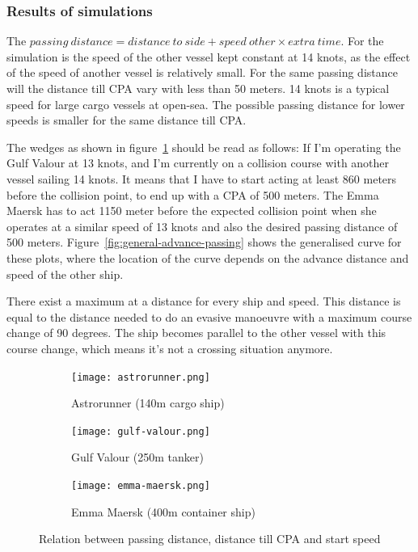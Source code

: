 \subsubsection{Results of simulations}
The $passing~distance = distance~to~side + speed~other \times extra~time$.
For the simulation is the speed of the other vessel kept constant at 14 knots, as the effect of the speed of another vessel is relatively small. For the same passing distance will the distance till CPA vary with less than 50 meters. 14 knots is a typical speed for large cargo vessels at open-sea. The possible passing distance for lower speeds is smaller for the same distance till CPA.

The wedges as shown in figure~\ref{fig:result-distance-passing-distance-start-speed} should be read as follows: If I'm operating the Gulf Valour at 13 knots, and I'm currently on a collision course with another vessel sailing 14 knots. It means that I have to start acting at least 860 meters before the collision point, to end up with a \ac{CPA} of 500 meters.
The Emma Maersk has to act 1150 meter before the expected collision point when she operates at a similar speed of 13 knots and also the desired passing distance of 500 meters. Figure~\ref{fig:general-advance-passing} shows the generalised curve for these plots, where the location of the curve depends on the advance distance and speed of the other ship.

There exist a maximum at a distance for every ship and speed. This distance is equal to the distance needed to do an evasive manoeuvre with a maximum course change of 90 degrees. The ship becomes parallel to the other vessel with this course change, which means it's not a crossing situation anymore.

\begin{figure}[!p]
	\centering
	\begin{subfigure}[b]{0.6\textwidth}
		\texttt{[image: astrorunner.png]} 
		\caption{Astrorunner (140m  cargo ship)} 
	\end{subfigure}
	\begin{subfigure}[b]{0.6\linewidth}
		\texttt{[image: gulf-valour.png]} 
		\caption{Gulf Valour (250m tanker)} 
	\end{subfigure}
	\begin{subfigure}[b]{0.6\textwidth}
		\texttt{[image: emma-maersk.png]} 
		\caption{Emma Maersk (400m container ship)} 
	\end{subfigure}
	\caption{Relation between passing distance, distance till CPA and start speed} 
	\label{fig:result-distance-passing-distance-start-speed} 
\end{figure}

